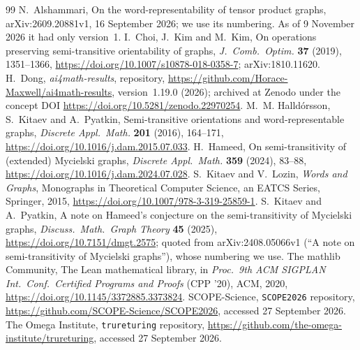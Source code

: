 \documentclass[11pt]{article}
\theoremstyle{remark}
\newcommand{\repoversion}{1.19.0}
\begin{document}
{\small
\begin{thebibliography}{99}
N.~Alshammari, On the word-representability of tensor product graphs,
arXiv:2609.20881v1, 16 September 2026; we use its numbering. As of
9 November 2026 it had only version~1.
I.~Choi, J.~Kim and M.~Kim, On operations preserving semi-transitive
orientability of graphs, \emph{J.\ Comb.\ Optim.} \textbf{37} (2019),
1351--1366, \url{https://doi.org/10.1007/s10878-018-0358-7};
arXiv:1810.11620.
H.~Dong, \emph{ai4math-results}, repository,
\url{https://github.com/Horace-Maxwell/ai4math-results}, version~\repoversion{}
(2026); archived at Zenodo under the concept DOI
\url{https://doi.org/10.5281/zenodo.22970254}.
M.~M. Halld\'orsson, S.~Kitaev and A.~Pyatkin, Semi-transitive orientations
and word-representable graphs, \emph{Discrete Appl.\ Math.} \textbf{201}
(2016), 164--171, \url{https://doi.org/10.1016/j.dam.2015.07.033}.
H.~Hameed, On semi-transitivity of (extended) Mycielski graphs,
\emph{Discrete Appl.\ Math.} \textbf{359} (2024), 83--88,
\url{https://doi.org/10.1016/j.dam.2024.07.028}.
S.~Kitaev and V.~Lozin, \emph{Words and Graphs}, Monographs in Theoretical
Computer Science, an EATCS Series, Springer, 2015,
\url{https://doi.org/10.1007/978-3-319-25859-1}.
S.~Kitaev and A.~Pyatkin, A note on Hameed's conjecture on the
semi-transitivity of Mycielski graphs, \emph{Discuss.\ Math.\ Graph Theory}
\textbf{45} (2025), \url{https://doi.org/10.7151/dmgt.2575}; quoted from
arXiv:2408.05066v1 (``A note on semi-transitivity of Mycielski graphs''),
whose numbering we use.
The mathlib Community, The Lean mathematical library, in \emph{Proc.\ 9th ACM
SIGPLAN Int.\ Conf.\ Certified Programs and Proofs} (CPP '20), ACM, 2020,
\url{https://doi.org/10.1145/3372885.3373824}.
SCOPE-Science, \texttt{SCOPE2026} repository,
\url{https://github.com/SCOPE-Science/SCOPE2026}, accessed 27 September 2026.
The Omega Institute, \texttt{trureturing} repository,
\url{https://github.com/the-omega-institute/trureturing}, accessed 27
September 2026.
\end{thebibliography}}
\end{document}
